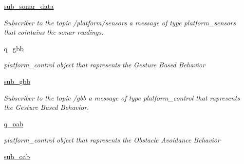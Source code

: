 \begin{DoxyCompactItemize}
\mbox{\hyperlink{classswitching__behavior__miro_1_1SwitchingBehavior_a37695a832fc2eda0b7d95921567dd730}{sub\+\_\+sonar\+\_\+data}}
\begin{DoxyCompactList}\small\item\em Subscriber to the topic /platform/sensors a message of type platform\+\_\+sensors that cointains the sonar readings. \end{DoxyCompactList}\item 
\mbox{\label{classswitching__behavior__miro_1_1SwitchingBehavior_afcea4d81d5d5d8ac35e185be543c78c9}} 
\mbox{\hyperlink{classswitching__behavior__miro_1_1SwitchingBehavior_afcea4d81d5d5d8ac35e185be543c78c9}{q\+\_\+gbb}}
\begin{DoxyCompactList}\small\item\em platform\+\_\+control object that rapresents the Gesture Based Behavior \end{DoxyCompactList}\item 
\mbox{\label{classswitching__behavior__miro_1_1SwitchingBehavior_af4d22aa3a2e444bf596db816dcc6d7ba}} 
\mbox{\hyperlink{classswitching__behavior__miro_1_1SwitchingBehavior_af4d22aa3a2e444bf596db816dcc6d7ba}{sub\+\_\+gbb}}
\begin{DoxyCompactList}\small\item\em Subscriber to the topic /gbb a message of type platform\+\_\+control that rapresents the Gesture Based Behavior. \end{DoxyCompactList}\item 
\mbox{\label{classswitching__behavior__miro_1_1SwitchingBehavior_ab6ecf6be83cdbd32e2467a4569b98c61}} 
\mbox{\hyperlink{classswitching__behavior__miro_1_1SwitchingBehavior_ab6ecf6be83cdbd32e2467a4569b98c61}{q\+\_\+oab}}
\begin{DoxyCompactList}\small\item\em platform\+\_\+control object that rapresents the Obstacle Avoidance Behavior \end{DoxyCompactList}\item 
\mbox{\label{classswitching__behavior__miro_1_1SwitchingBehavior_a91a3fb683593636854dbccfd053c4712}} 
\mbox{\hyperlink{classswitching__behavior__miro_1_1SwitchingBehavior_a91a3fb683593636854dbccfd053c4712}{sub\+\_\+oab}}

\end{DoxyCompactItemize}
